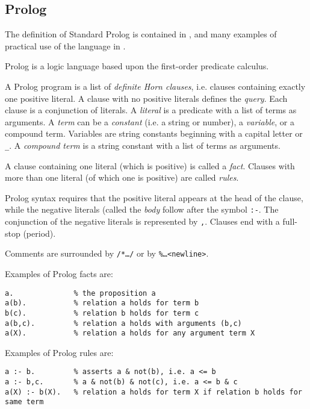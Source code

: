 \subsection{Prolog}

The definition of Standard Prolog is contained in \cite{DEC96}, and many
examples of practical use of the language in \cite{CM87}.

Prolog is a logic language based upon the first-order predicate calculus.\\

A Prolog program
is a list of \textit{definite Horn clauses}, i.e. clauses containing exactly one
positive literal.  A clause with no positive literals defines the \textit{query}.
Each clause is a conjunction of literals.  A \textit{literal} is a predicate with
a list of terms as arguments.  A \textit{term} can be a \textit{constant} (i.e.
a string or number), a \textit{variable}, or a compound term. 
Variables are string constants beginning with a capital letter or \texttt{\_{}}.
A \textit{compound term}
is a string constant with a list of terms as arguments.

A clause containing one literal (which is positive) is called a \textit{fact}.  Clauses
with more than one literal (of which one is positive) are called \textit{rules}.

Prolog syntax requires that the positive literal appears at the head of the clause,
while the negative literals (called the \textit{body}
follow after the symbol \texttt{:-}.  The conjunction of
the negative literals is represented by \texttt{,}.  Clauses end with a full-stop (period).

Comments are surrounded by \texttt{/*\ldots*/} or by \texttt{\%\ldots<newline>}.

Examples of Prolog facts are:
\begin{verbatim}
a.              % the proposition a
a(b).           % relation a holds for term b
b(c).           % relation b holds for term c
a(b,c).         % relation a holds with arguments (b,c)
a(X).           % relation a holds for any argument term X
\end{verbatim}

Examples of Prolog rules are:
\begin{verbatim}
a :- b.         % asserts a & not(b), i.e. a <= b
a :- b,c.       % a & not(b) & not(c), i.e. a <= b & c
a(X) :- b(X).   % relation a holds for term X if relation b holds for same term
\end{verbatim}

